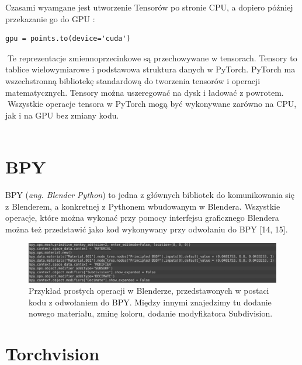 \documentclass[openright]{xmgr}
\begin{document}
Czasami wyamgane jest utworzenie Tensorów po stronie CPU, a dopiero później przekazanie go do GPU :

\begin{lstlisting}
gpu = points.to(device='cuda')
\end{lstlisting}



􏰹Te reprezentacje zmiennoprzecinkowe są przechowywane w tensorach. Tensory to tablice wielowymiarowe i podstawowa struktura danych w PyTorch. PyTorch ma wszechstronną bibliotekę standardową do tworzenia tensorów i operacji matematycznych. Tensory można uszeregować na dysk i ładować z powrotem.
􏰹Wszystkie operacje tensora w PyTorch mogą być wykonywane zarówno na CPU, jak i na GPU bez zmiany kodu.
\\
\\
  \section{BPY\label{s:dsssl}}
  
  \indent \indent  BPY (\textit{ang. Blender Python}) to jedna z głównych bibliotek do komunikowania się z Blenderem, a konkretnej z Pythonem wbudowanym w Blendera. Wszystkie operacje, które można wykonać przy pomocy interfejsu graficznego Blendera można też przedstawić jako kod wykonywany przy odwołaniu do BPY [14, 15].
  
  
  \begin{figure}[!tbh]
\centering
\includegraphics[width=1.1\hsize]{fig/8}
\caption{Przykład prostych operacji w Blenderze, przedstawonych w postaci kodu z odwołaniem do BPY. Między innymi znajedzimy tu dodanie nowego materiału, zminę koloru, dodanie modyfikatora Subdivision.\label{RYS.3}}
\end{figure}

    \section{Torchvision\label{s:dsssl}}
    
\end{document}
